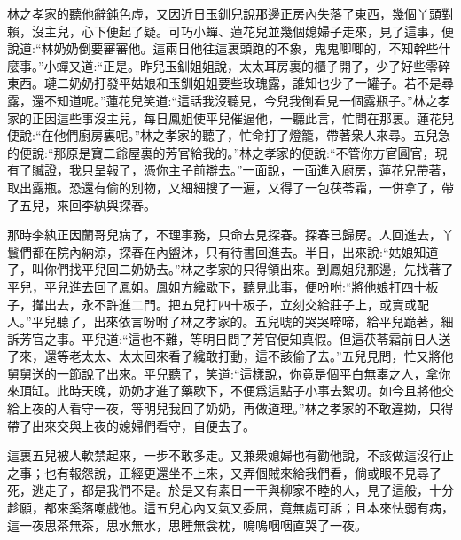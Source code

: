 \begin{parag}
    林之孝家的聽他辭鈍色虛，又因近日玉釧兒說那邊正房內失落了東西，幾個丫頭對賴，沒主兒，心下便起了疑。可巧小蟬、蓮花兒並幾個媳婦子走來，見了這事，便說道:“林奶奶倒要審審他。這兩日他往這裏頭跑的不象，鬼鬼唧唧的，不知幹些什麼事。”小蟬又道:“正是。昨兒玉釧姐姐說，太太耳房裏的櫃子開了，少了好些零碎東西。璉二奶奶打發平姑娘和玉釧姐姐要些玫瑰露，誰知也少了一罐子。若不是尋露，還不知道呢。”蓮花兒笑道:“這話我沒聽見，今兒我倒看見一個露瓶子。”林之孝家的正因這些事沒主兒，每日鳳姐使平兒催逼他，一聽此言，忙問在那裏。蓮花兒便說:“在他們廚房裏呢。”林之孝家的聽了，忙命打了燈籠，帶著衆人來尋。五兒急的便說:“那原是寶二爺屋裏的芳官給我的。”林之孝家的便說:“不管你方官圓官，現有了贓證，我只呈報了，憑你主子前辯去。”一面說，一面進入廚房，蓮花兒帶著，取出露瓶。恐還有偷的別物，又細細搜了一遍，又得了一包茯苓霜，一併拿了，帶了五兒，來回李紈與探春。
\end{parag}


\begin{parag}
    那時李紈正因蘭哥兒病了，不理事務，只命去見探春。探春已歸房。人回進去，丫鬟們都在院內納涼，探春在內盥沐，只有待書回進去。半日，出來說:“姑娘知道了，叫你們找平兒回二奶奶去。”林之孝家的只得領出來。到鳳姐兒那邊，先找著了平兒，平兒進去回了鳳姐。鳳姐方纔歇下，聽見此事，便吩咐:“將他娘打四十板子，攆出去，永不許進二門。把五兒打四十板子，立刻交給莊子上，或賣或配人。”平兒聽了，出來依言吩咐了林之孝家的。五兒唬的哭哭啼啼，給平兒跪著，細訴芳官之事。平兒道:“這也不難，等明日問了芳官便知真假。但這茯苓霜前日人送了來，還等老太太、太太回來看了纔敢打動，這不該偷了去。”五兒見問，忙又將他舅舅送的一節說了出來。平兒聽了，笑道:“這樣說，你竟是個平白無辜之人，拿你來頂缸。此時天晚，奶奶才進了藥歇下，不便爲這點子小事去絮叨。如今且將他交給上夜的人看守一夜，等明兒我回了奶奶，再做道理。”林之孝家的不敢違拗，只得帶了出來交與上夜的媳婦們看守，自便去了。
\end{parag}


\begin{parag}
    這裏五兒被人軟禁起來，一步不敢多走。又兼衆媳婦也有勸他說，不該做這沒行止之事；也有報怨說，正經更還坐不上來，又弄個賊來給我們看，倘或眼不見尋了死，逃走了，都是我們不是。於是又有素日一干與柳家不睦的人，見了這般，十分趁願，都來奚落嘲戲他。這五兒心內又氣又委屈，竟無處可訴；且本來怯弱有病，這一夜思茶無茶，思水無水，思睡無衾枕，嗚嗚咽咽直哭了一夜。
\end{parag}


